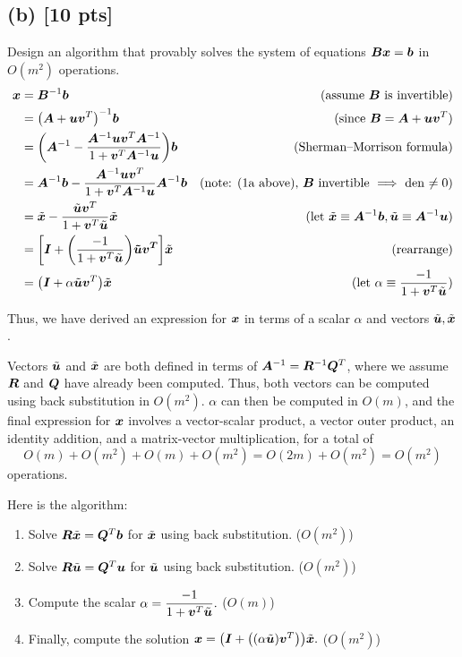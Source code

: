 \documentclass[twoside,10pt]{article}
\begin{document}
\subsection*{(b) [10 pts]} 
Design an algorithm that provably solves the system of equations $\bm{B} \bm{x} = \bm{b}$ in $O(m^2)$ operations. 
\begin{align*}
  \vct{x} &= \mtx{B}^{-1}\vct{b}&\text{(assume $\mtx{B}$ is invertible)}\\
  &= \left(\mtx{A} + \vct{u}\vct{v}^T\right)^{-1}\vct{b}&\text{(since $\mtx{B} = \mtx{A} + \vct{u}\vct{v}^T$)}\\
  &= \left(\mtx{A}^{-1} - \dfrac{\mtx{A}^{-1}\vct{u}\vct{v}^T\mtx{A}^{-1}}{1+\vct{v}^T\mtx{A}^{-1}\vct{u}}\right)\vct{b}&\text{(Sherman–Morrison formula)}\\
  &= \mtx{A}^{-1}\vct{b} - \dfrac{\mtx{A}^{-1}\vct{u}\vct{v}^T}{1+\vct{v}^T\mtx{A}^{-1}\vct{u}}\mtx{A}^{-1}\vct{b}&\text{(note: (1a above), $\mtx{B}$ invertible $\implies$ den $\neq 0$)}\\
  &= \tilde{\vct{x}} - \dfrac{\tilde{\vct{u}}\vct{v}^T}{1+\vct{v}^T\tilde{\vct{u}}}\tilde{\vct{x}}&\text{(let $\tilde{\vct{x}} \equiv \mtx{A}^{-1}\vct{b}, \tilde{\vct{u}} \equiv \mtx{A}^{-1}\vct{u}$)}\\
  &= \left[\vct{I} + \left(\dfrac{-1}{1+\vct{v}^T\tilde{\vct{u}}}\right)\vct{\tilde{\vct{u}}\vct{v}^T}\right]\tilde{\vct{x}}&\text{(rearrange)}\\
  &= \left(\vct{I} + \alpha\tilde{\vct{u}}\vct{v}^T\right)\tilde{\vct{x}}&\text{(let $\alpha \equiv \dfrac{-1}{1+\vct{v}^T\tilde{\vct{u}}}$)}
\end{align*}

\quad Thus, we have derived an expression for $\bm{x}$ in terms of a scalar $\alpha$ and vectors $\tilde{\bm{u}}, \tilde{\bm{x}}$.

\quad Vectors $\tilde{\bm{u}}$ and $\tilde{\bm{x}}$ are both defined in terms of $\bm{A}^{-1} = \bm{R}^{-1}\bm{Q}^T$, where we assume $\bm{R}$ and $\bm{Q}$ have already been computed.
Thus, both vectors can be computed using back substitution in $O(m^2)$.
$\alpha$ can then be computed in $O(m)$, and the final expression for $\bm{x}$ involves a vector-scalar product, a vector outer product, an identity addition, and a matrix-vector multiplication, for a total of
$$O(m) + O(m^2) + O(m) + O(m^2) = O(2m) + O(m^2) = O(m^2)$$
operations.

\quad Here is the algorithm:
\begin{enumerate}
  \item Solve $\bm{R}\tilde{\bm{x}} = \bm{Q}^T\bm{b}$ for $\tilde{\bm{x}}$ using back substitution. ($O(m^2)$)
  \item Solve $\bm{R}\tilde{\bm{u}} = \bm{Q}^T\bm{u}$ for $\tilde{\bm{u}}$ using back substitution. ($O(m^2)$)
  \item Compute the scalar $\alpha = \dfrac{-1}{1+\bm{v}^T\tilde{\bm{u}}}.$ ($O(m)$)
  \item Finally, compute the solution $\vct{x} = \left(\vct{I} + \left(\left(\alpha\tilde{\vct{u}}\right)\vct{v}^T\right)\right)\tilde{\vct{x}}.$ ($O(m^2)$)
\end{enumerate}
\end{document}
